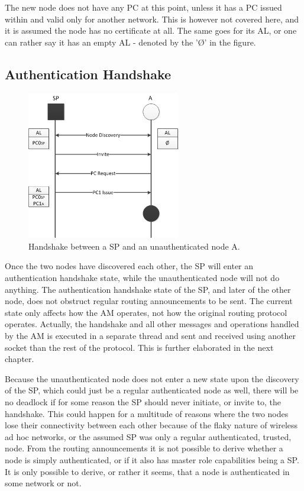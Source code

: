 The new node does not have any \ac{PC} at this point, unless it has a \ac{PC}
issued within and valid only for another network. This is however not covered
here, and it is assumed the node has no certificate at all. The same goes for
its \ac{AL}, or one can rather say it has an empty \ac{AL} - denoted by the
'\O' in the figure.

\subsection{Authentication Handshake}

\begin{figure}[h]
	\centering
  	\includegraphics[width=0.6\textwidth]{images/node_states_handshake.png}
  	\caption{Handshake between a \acf{SP} and an unauthenticated node A.}
	\label{fig:node_states_handshake}
\end{figure}

Once the two nodes have discovered each other, the \ac{SP} will enter an
authentication handshake state, while the unauthenticated node will not do
anything. The authentication handshake state of the \ac{SP}, and later of the
other node, does not obstruct regular routing announcements to be sent. The
current state only affects how the \ac{AM} operates, not how the original
routing protocol operates. Actually, the handshake and all other messages and
operations handled by the \ac{AM} is executed in a separate thread and sent
and received using another socket than the rest of the protocol. This is
further elaborated in the next chapter.

Because the unauthenticated node does not enter a new state upon the discovery
of the \ac{SP}, which could just be a regular authenticated node as well, there
will be no deadlock if for some reason the \ac{SP} should never initiate, or
invite to, the handshake. This could happen for a multitude of reasons where
the two nodes lose their connectivity between each other because of the flaky
nature of wireless ad hoc networks, or the assumed \ac{SP} was only a regular
authenticated, trusted, node. From the routing announcements it is not possible
to derive whether a node is simply authenticated, or if it also has master role
capabilities being a \ac{SP}. It is only possible to derive, or rather it seems,
that a node is authenticated in some network or not.


